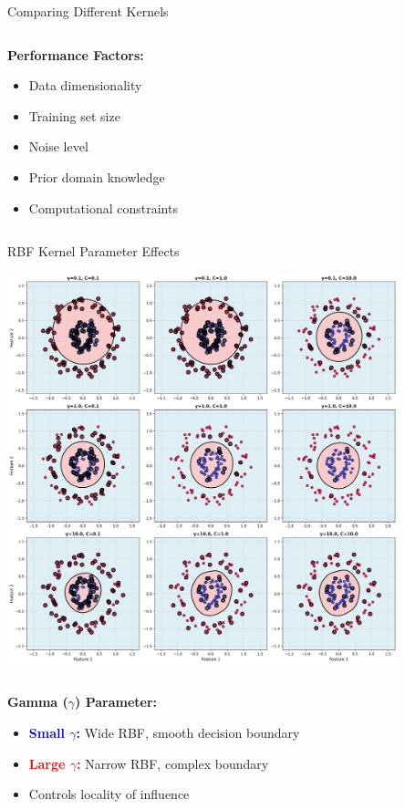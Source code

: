 \documentclass[8pt,aspectratio=1610]{beamer}
\begin{document}
\begin{frame}{Comparing Different Kernels}
\begin{columns}[t]
\begin{column}{0.48\textwidth}
\textbf{Performance Factors:}
\begin{itemize}
\setlength{\itemsep}{1pt}
\item Data dimensionality
\item Training set size
\item Noise level
\item Prior domain knowledge
\item Computational constraints
\end{itemize}
\end{column}
\end{columns}
\end{frame}

\begin{frame}{RBF Kernel Parameter Effects}
\begin{center}
\includegraphics[width=0.85\textwidth]{../figures/rbf_kernel_parameters.png}
\end{center}

\begin{columns}[t]
\begin{column}{0.48\textwidth}
\textbf{Gamma ($\gamma$) Parameter:}
\begin{itemize}
\setlength{\itemsep}{1pt}
\item \textcolor{blue}{\textbf{Small $\gamma$:}} Wide RBF, smooth decision boundary
\item \textcolor{red}{\textbf{Large $\gamma$:}} Narrow RBF, complex boundary
\item Controls locality of influence
\end{itemize}
\end{column}


\end{columns}
\end{frame}
\end{document}
